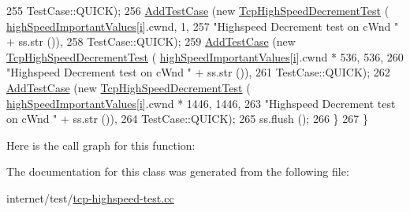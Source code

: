 \begin{DoxyCode}
255                      TestCase::QUICK);
256         \hyperlink{classns3_1_1TestCase_a3718088e3eefd5d6454569d2e0ddd835}{AddTestCase} (\textcolor{keyword}{new} \hyperlink{classTcpHighSpeedDecrementTest}{TcpHighSpeedDecrementTest} (
      \hyperlink{group__internet-test_gae438c206bcae7bc361b00919b5038a18}{highSpeedImportantValues}[\hyperlink{bernuolliDistribution_8m_a6f6ccfcf58b31cb6412107d9d5281426}{i}].cwnd, 1,
257                                                     \textcolor{stringliteral}{"Highspeed Decrement test on cWnd "} + ss.str ()),
258                      TestCase::QUICK);
259         \hyperlink{classns3_1_1TestCase_a3718088e3eefd5d6454569d2e0ddd835}{AddTestCase} (\textcolor{keyword}{new} \hyperlink{classTcpHighSpeedDecrementTest}{TcpHighSpeedDecrementTest} (
      \hyperlink{group__internet-test_gae438c206bcae7bc361b00919b5038a18}{highSpeedImportantValues}[\hyperlink{bernuolliDistribution_8m_a6f6ccfcf58b31cb6412107d9d5281426}{i}].cwnd * 536, 536,
260                                                     \textcolor{stringliteral}{"Highspeed Decrement test on cWnd "} + ss.str ()),
261                      TestCase::QUICK);
262         \hyperlink{classns3_1_1TestCase_a3718088e3eefd5d6454569d2e0ddd835}{AddTestCase} (\textcolor{keyword}{new} \hyperlink{classTcpHighSpeedDecrementTest}{TcpHighSpeedDecrementTest} (
      \hyperlink{group__internet-test_gae438c206bcae7bc361b00919b5038a18}{highSpeedImportantValues}[\hyperlink{bernuolliDistribution_8m_a6f6ccfcf58b31cb6412107d9d5281426}{i}].cwnd * 1446, 1446,
263                                                     \textcolor{stringliteral}{"Highspeed Decrement test on cWnd "} + ss.str ()),
264                      TestCase::QUICK);
265         ss.flush ();
266       \}
267   \}
\end{DoxyCode}


Here is the call graph for this function\+:




The documentation for this class was generated from the following file\+:\begin{DoxyCompactItemize}
\item 
internet/test/\hyperlink{tcp-highspeed-test_8cc}{tcp-\/highspeed-\/test.\+cc}\end{DoxyCompactItemize}
